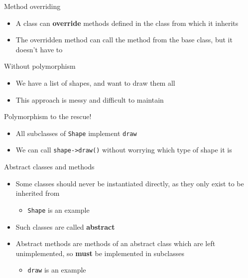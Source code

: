 \begin{frame}{Method overriding}
\begin{itemize}
	\pause\item A class can \textbf{override} methods defined in the class from which it inherits
	\pause\item The overridden method can call the method from the base class, but it doesn't have to
\end{itemize}
\end{frame}

\begin{frame}{Without polymorphism}
\begin{itemize}
	\pause\item We have a list of shapes, and want to draw them all
	\pause\item This approach is messy and difficult to maintain
\end{itemize}
\end{frame}

\begin{frame}{Polymorphism to the rescue!}
\begin{itemize}
	\pause\item All subclasses of \lstinline{Shape} implement \lstinline{draw}
	\pause\item We can call \lstinline{shape->draw()} without worrying which type of shape it is
\end{itemize}
\end{frame}

\begin{frame}{Abstract classes and methods}
\begin{itemize}
	\pause\item Some classes should never be instantiated directly, as they only exist to be inherited from
	\begin{itemize}
		\pause\item \lstinline{Shape} is an example
	\end{itemize}
	\pause\item Such classes are called \textbf{abstract}
	\pause\item Abstract methods are methods of an abstract class which are left unimplemented, so \textbf{must} be implemented in subclasses
	\begin{itemize}
		\pause\item \lstinline{draw} is an example
	\end{itemize}
\end{itemize}
\end{frame}

